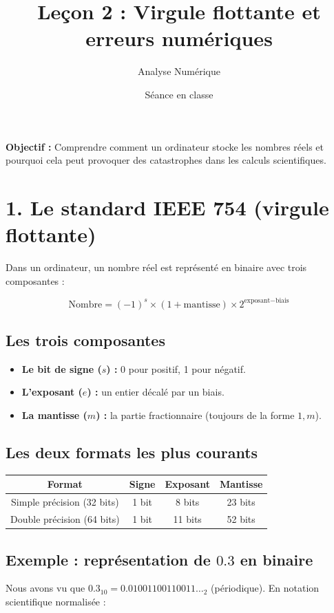 \documentclass[12pt,letterpaper]{article}
\title{Leçon 2 : Virgule flottante et erreurs numériques}
\author{Analyse Numérique}
\date{Séance en classe}
\begin{document}
\maketitle

\begin{center}
\textbf{Objectif :} Comprendre comment un ordinateur stocke les nombres réels et pourquoi cela peut provoquer des catastrophes dans les calculs scientifiques.
\end{center}

\section*{1. Le standard IEEE 754 (virgule flottante)}

Dans un ordinateur, un nombre réel est représenté en binaire avec trois composantes :

\[
\text{Nombre} = (-1)^s \times (1 + \text{mantisse}) \times 2^{\text{exposant} - \text{biais}}
\]

\subsection*{Les trois composantes}
\begin{itemize}
    \item \textbf{Le bit de signe ($s$) :} 0 pour positif, 1 pour négatif.
    \item \textbf{L'exposant ($e$) :} un entier décalé par un biais.
    \item \textbf{La mantisse ($m$) :} la partie fractionnaire (toujours de la forme $1,m$).
\end{itemize}

\subsection*{Les deux formats les plus courants}
\begin{center}
\begin{tabular}{|c|c|c|c|}
\hline
\textbf{Format} & \textbf{Signe} & \textbf{Exposant} & \textbf{Mantisse} \\
\hline
Simple précision (32 bits)  & 1 bit & 8 bits & 23 bits \\
Double précision (64 bits)  & 1 bit & 11 bits & 52 bits \\
\hline
\end{tabular}
\end{center}

\subsection*{Exemple : représentation de $0.3$ en binaire}
Nous avons vu que $0.3_{10} = 0.01001100110011\ldots_2$ (périodique). En notation scientifique normalisée :
\end{document}
